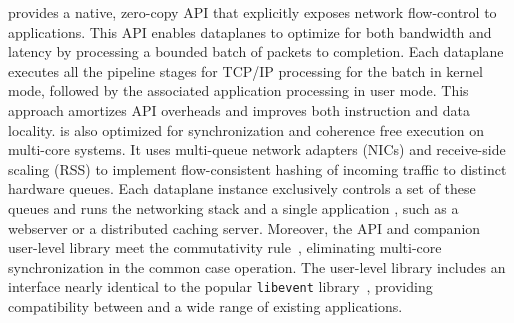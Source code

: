 \ix provides a native, zero-copy API that explicitly exposes network
flow-control to applications.  This API enables dataplanes to optimize
for both bandwidth and latency by processing a bounded batch of
packets to completion.  Each dataplane executes all the pipeline
stages for TCP/IP processing for the batch in kernel mode, followed by
the associated application processing in user mode. This approach
amortizes API overheads and improves both instruction and data
locality.  \ix is also optimized for synchronization and coherence
free execution on multi-core systems. It uses multi-queue network
adapters (NICs) and receive-side scaling (RSS) to implement
flow-consistent hashing of incoming traffic to distinct hardware
queues. Each dataplane instance exclusively controls a set of these
queues and runs the networking stack and a single application , such as
a webserver or a distributed caching server. Moreover, the \ix API and
companion user-level library meet the commutativity
rule~\cite{DBLP:conf/sosp/ClementsKZMK13}, eliminating multi-core
synchronization in the common case operation. The \ix user-level
library includes an interface nearly identical to the popular
\texttt{libevent} library~\cite{provos2003libevent}, providing
compatibility between \ix and a wide range of existing applications.





